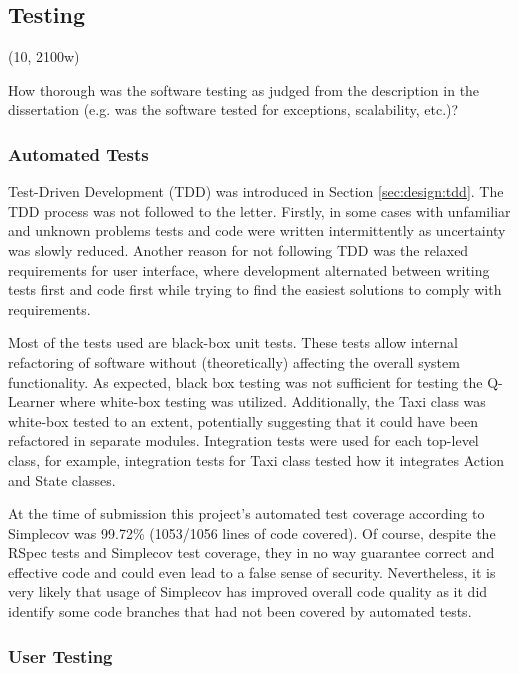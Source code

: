 \subsection{Testing}
\label{sec:implementation:testing}

(10, 2100w)

How thorough was the software testing as judged from the description in the
dissertation (e.g. was the software tested for exceptions, scalability, etc.)?


\subsubsection{Automated Tests}
\label{sec:implementation:testing:automated}

Test-Driven Development (TDD) was introduced in Section \ref{sec:design:tdd}.
The TDD process was not followed to the letter. Firstly, in some cases with
unfamiliar and unknown problems tests and code were written intermittently as
uncertainty was slowly reduced. Another reason for not following TDD was the
relaxed requirements for user interface, where development alternated between
writing tests first and code first while trying to find the easiest solutions
to comply with requirements.

Most of the tests used are black-box unit tests. These tests allow internal
refactoring of software without (theoretically) affecting the overall system
functionality. As expected, black box testing was not sufficient for testing
the Q-Learner where white-box testing was utilized. Additionally, the Taxi
class was white-box tested to an extent, potentially suggesting that it could
have been refactored in separate modules. Integration tests were used for each
top-level class, for example, integration tests for Taxi class tested how it
integrates Action and State classes.

At the time of submission this project's automated test coverage according to
Simplecov was 99.72\% (1053/1056 lines of code covered). Of course, despite the
RSpec tests and Simplecov test coverage, they in no way guarantee correct and
effective code and could even lead to a false sense of security. Nevertheless,
it is very likely that usage of Simplecov has improved overall code quality as
it did identify some code branches that had not been covered by automated
tests.


\subsubsection{User Testing}

